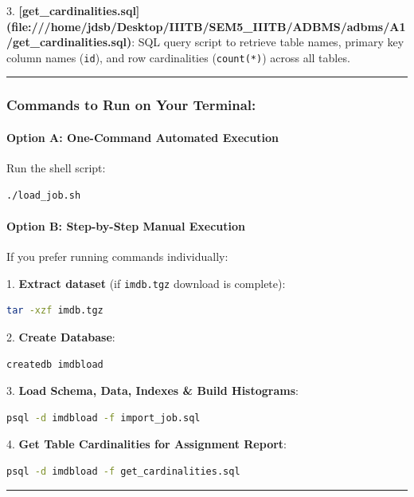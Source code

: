 \documentclass[11pt,a4paper]{article}
\begin{document}
3. \textbf{[get\_cardinalities.sql](file:///home/jdsb/Desktop/IIITB/SEM5\_IIITB/ADBMS/adbms/A1/get\_cardinalities.sql)}: SQL query script to retrieve table names, primary key column names (\texttt{id}), and row cardinalities (\texttt{count(*)}) across all tables.


\hrule


\subsubsection{Commands to Run on Your Terminal:}

\paragraph{Option A: One-Command Automated Execution}
Run the shell script:

\begin{lstlisting}[language=bash]
./load_job.sh
\end{lstlisting}


\paragraph{Option B: Step-by-Step Manual Execution}
If you prefer running commands individually:


1. \textbf{Extract dataset} (if \texttt{imdb.tgz} download is complete):

\begin{lstlisting}[language=bash]
   tar -xzf imdb.tgz
\end{lstlisting}

2. \textbf{Create Database}:

\begin{lstlisting}[language=bash]
   createdb imdbload
\end{lstlisting}

3. \textbf{Load Schema, Data, Indexes \& Build Histograms}:

\begin{lstlisting}[language=bash]
   psql -d imdbload -f import_job.sql
\end{lstlisting}

4. \textbf{Get Table Cardinalities for Assignment Report}:

\begin{lstlisting}[language=bash]
   psql -d imdbload -f get_cardinalities.sql
\end{lstlisting}


\hrule
\end{document}
